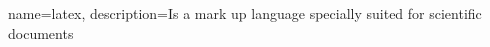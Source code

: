 {
	name=latex,
	description={Is a mark up language specially suited 
		for scientific documents}
}



\printglossaries